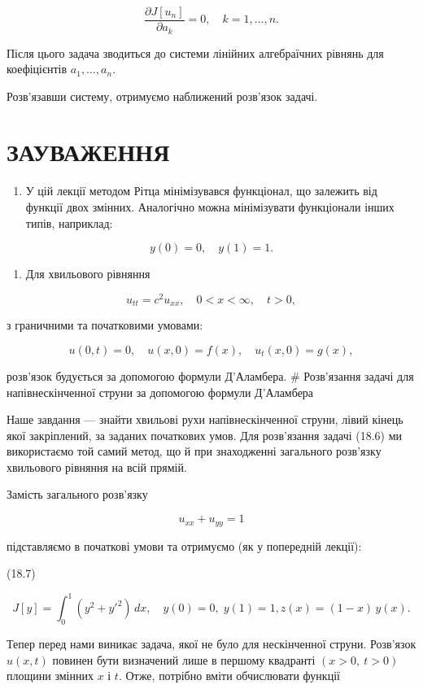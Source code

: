 \documentclass[
  ukrainian,
]{article}
\providecommand{\tightlist}{%
  \setlength{\itemsep}{0pt}\setlength{\parskip}{0pt}}
\begin{document}
\[
\frac{\partial J[u_n]}{\partial a_k}=0,\quad k=1,\dots,n.
\]

Після цього задача зводиться до системи лінійних алгебраїчних рівнянь
для коефіцієнтів \(a_1,\dots,a_n\).

Розв'язавши систему, отримуємо наближений розв'язок задачі.

\section{ЗАУВАЖЕННЯ}\label{ux437ux430ux443ux432ux430ux436ux435ux43dux43dux44f-9}

\begin{enumerate}
\def\labelenumi{\arabic{enumi}.}
\tightlist
\item
  У цій лекції методом Рітца мінімізувався функціонал, що залежить від
  функції двох змінних. Аналогічно можна мінімізувати функціонали інших
  типів, наприклад:
\end{enumerate}

\[
y(0)=0,\quad y(1)=1.
\]

\begin{enumerate}
\def\labelenumi{\arabic{enumi}.}
\setcounter{enumi}{1}
\tightlist
\item
  Для хвильового рівняння
\end{enumerate}

\[
u_{tt}=c^2u_{xx}, \quad 0<x<\infty,\quad t>0,
\]

з граничними та початковими умовами:

\[
u(0,t)=0,\quad u(x,0)=f(x),\quad u_t(x,0)=g(x),
\]

розв'язок будується за допомогою формули Д'Аламбера. \# Розв'язання
задачі для напівнескінченної струни за допомогою формули Д'Аламбера

Наше завдання --- знайти хвильові рухи напівнескінченної струни, лівий
кінець якої закріплений, за заданих початкових умов. Для розв'язання
задачі (18.6) ми використаємо той самий метод, що й при знаходженні
загального розв'язку хвильового рівняння на всій прямій.

Замість загального розв'язку

\[
u_{xx} + u_{yy} = 1
\]

підставляємо в початкові умови та отримуємо (як у попередній лекції):

(18.7)

\[
J[y] = \int_{0}^{1} (y^{2} + {y'}^{2})\,dx,\quad y(0) = 0,\; y(1) = 1,
z(x) = (1 - x)\, y(x).
\]

Тепер перед нами виникає задача, якої не було для нескінченної струни.
Розв'язок \(u(x,t)\) повинен бути визначений лише в першому квадранті
\((x>0,\ t>0)\) площини змінних \(x\) і \(t\). Отже, потрібно вміти
обчислювати функції
\end{document}
